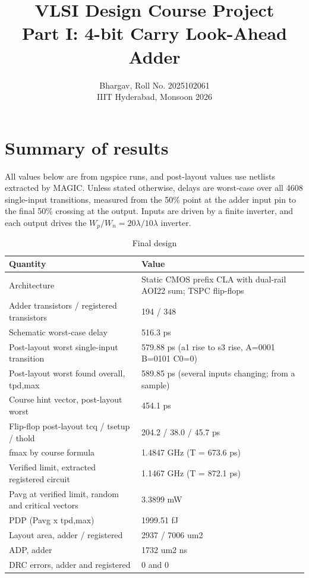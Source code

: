 \documentclass[10pt,a4paper]{article}
\title{VLSI Design Course Project\\Part I: 4-bit Carry Look-Ahead Adder}
\author{Bhargav, Roll No. 2025102061\\IIIT Hyderabad, Monsoon 2026}
\date{}
\begin{document}
\maketitle
\tableofcontents

\section*{Summary of results}
All values below are from ngspice runs, and post-layout values use netlists extracted by MAGIC. Unless stated otherwise, delays are worst-case over all 4608 single-input transitions, measured from the 50\% point at the adder input pin to the final 50\% crossing at the output. Inputs are driven by a finite inverter, and each output drives the $W_p/W_n=20\lambda/10\lambda$ inverter.

\begin{table}[H]\centering
\small
\caption{Final design}
\begin{tabular}{p{7.2cm}p{8.2cm}}
\toprule
\textbf{Quantity} & \textbf{Value} \\
\midrule
Architecture & Static CMOS prefix CLA with dual-rail AOI22 sum; TSPC flip-flops \\
Adder transistors / registered transistors & 194 / 348 \\
Schematic worst-case delay & 516.3 ps \\
Post-layout worst single-input transition & 579.88 ps (a1 rise to s3 rise, A=0001 B=0101 C0=0) \\
Post-layout worst found overall, tpd,max & 589.85 ps (several inputs changing; from a sample) \\
Course hint vector, post-layout worst & 454.1 ps \\
Flip-flop post-layout tcq / tsetup / thold & 204.2 / 38.0 / 45.7 ps \\
fmax by course formula & 1.4847 GHz (T = 673.6 ps) \\
Verified limit, extracted registered circuit & 1.1467 GHz (T = 872.1 ps) \\
Pavg at verified limit, random and critical vectors & 3.3899 mW \\
PDP (Pavg x tpd,max) & 1999.51 fJ \\
Layout area, adder / registered & 2937 / 7006 um2 \\
ADP, adder & 1732 um2 ns \\
DRC errors, adder and registered & 0 and 0 \\
\bottomrule
\end{tabular}
\end{table}
\end{document}

